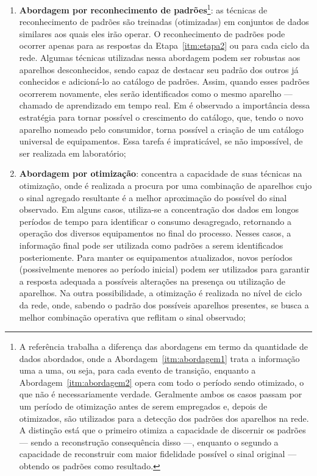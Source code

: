 \begin{enumerate}[label={Abordagem} \arabic* - ,ref=\arabic*,align=left]
\item\label{itm:abordagem1}\textbf{Abordagem por reconhecimento de
padrões}\footnote{A referência \cite{nilm_zeifman_review_2011}
trabalha a diferença das abordagens em termo da quantidade de dados
abordados, onde a Abordagem~\ref{itm:abordagem1} trata a informação
uma a uma, ou seja, para cada evento de transição, enquanto a
Abordagem~\ref{itm:abordagem2} opera com todo o período sendo
otimizado, o que não é necessariamente verdade. Geralmente ambos os casos passam
por um período de otimização antes de serem empregados e, depois de
otimizados, são utilizados para a detecção dos padrões dos aparelhos
na rede. A distinção está que o primeiro otimiza a capacidade de
discernir os padrões --- sendo a reconstrução consequência disso ---,
enquanto o segundo a capacidade de reconstruir com maior fidelidade
possível o sinal original --- obtendo os padrões como
resultado.\label{fn:diff_abordagens}}: as técnicas de reconhecimento
de padrões são treinadas (otimizadas) em conjuntos de dados similares
aos quais eles irão operar. O reconhecimento de padrões pode ocorrer
apenas para as respostas da Etapa~\ref{itm:etapa2} ou para cada ciclo
da rede. Algumas técnicas utilizadas nessa abordagem podem ser
robustas aos aparelhos desconhecidos, sendo capaz de destacar seu padrão
dos outros já conhecidos e adicioná-lo ao catálogo de padrões. Assim,
quando esses padrões ocorrerem novamente, eles serão identificados
como o mesmo aparelho --- chamado de aprendizado em tempo real. Em
\cite{nilm_matthews_overview_2008_22} é observado a importância dessa
estratégia para tornar possível o crescimento do catálogo, que, tendo
o novo aparelho nomeado pelo consumidor, torna possível a criação de
um catálogo universal de equipamentos. Essa tarefa é impraticável, se
não impossível, de ser realizada em laboratório;
\item\label{itm:abordagem2}\textbf{Abordagem
por otimização}: concentra a capacidade de
suas técnicas na otimização, onde é realizada a procura por uma
combinação de aparelhos cujo o sinal agregado resultante é a melhor
aproximação do possível do sinal observado. Em alguns casos,
utiliza-se a concentração dos dados em longos períodos de tempo para
identificar o consumo desagregado, retornando a operação dos diversos
equipamentos no final do processo. Nesses casos, a informação final
pode ser utilizada como padrões a serem identificados posteriomente.
Para manter os equipamentos atualizados, novos períodos (possivelmente
menores ao período inicial) podem ser utilizados para garantir a
resposta adequada a possíveis alterações na presença ou utilização de
aparelhos. Na outra possibilidade, a otimização é realizada no nível
de ciclo da rede, onde, sabendo o padrão dos possíveis aparelhos
presentes, se busca a melhor combinação operativa que reflitam o sinal
observado;
\end{enumerate}

